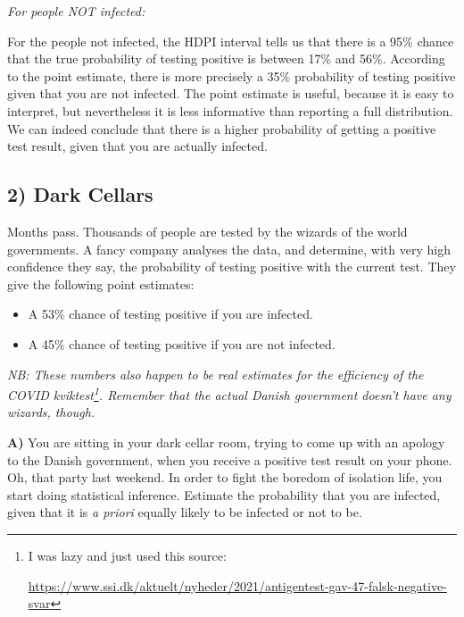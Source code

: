 \documentclass[
]{article}
\providecommand{\tightlist}{%
  \setlength{\itemsep}{0pt}\setlength{\parskip}{0pt}}
\begin{document}
\emph{For people NOT infected:}

For the people not infected, the HDPI interval tells us that there is a
95\% chance that the true probability of testing positive is between
17\% and 56\%. According to the point estimate, there is more precisely
a 35\% probability of testing positive given that you are not infected.
The point estimate is useful, because it is easy to interpret, but
nevertheless it is less informative than reporting a full
distribution.\\
We can indeed conclude that there is a higher probability of getting a
positive test result, given that you are actually infected.

\hypertarget{dark-cellars}{%
\subsection{2) Dark Cellars}\label{dark-cellars}}

Months pass. Thousands of people are tested by the wizards of the world
governments. A fancy company analyses the data, and determine, with very
high confidence they say, the probability of testing positive with the
current test. They give the following point estimates:

\begin{itemize}
\tightlist
\item
  A 53\% chance of testing positive if you are infected.
\item
  A 45\% chance of testing positive if you are not infected.
\end{itemize}

\emph{NB: These numbers also happen to be real estimates for the
efficiency of the COVID kviktest\footnote{I was lazy and just used this
  source:

  \url{https://www.ssi.dk/aktuelt/nyheder/2021/antigentest-gav-47-falsk-negative-svar}}.
Remember that the actual Danish government doesn't have any wizards,
though.}

\textbf{A)} You are sitting in your dark cellar room, trying to come up
with an apology to the Danish government, when you receive a positive
test result on your phone. Oh, that party last weekend. In order to
fight the boredom of isolation life, you start doing statistical
inference. Estimate the probability that you are infected, given that it
is \emph{a priori} equally likely to be infected or not to be.
\end{document}
